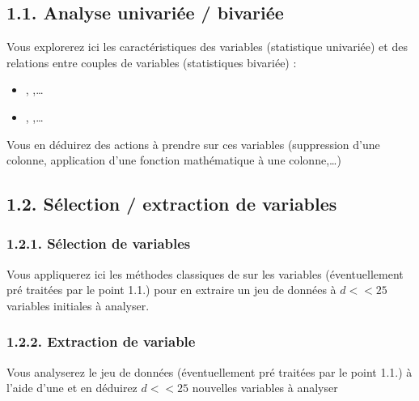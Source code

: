 \documentclass[letterpaper,10pt,french]{sphinxmanual}
\begin{document}
\subsection{1.1. Analyse univariée / bivariée}
\label{\detokenize{TP/TP_etudiant:analyse-univariee-bivariee}}
\sphinxAtStartPar
Vous explorerez ici les caractéristiques des variables (statistique univariée) et des relations entre couples de variables (statistiques bivariée) :
\begin{itemize}
\item {} 
\sphinxAtStartPar
{}, ,…

\item {} 
\sphinxAtStartPar
{}, ,…

\end{itemize}

\sphinxAtStartPar
Vous en déduirez des actions à prendre sur ces variables (suppression d’une colonne, application d’une fonction mathématique à une colonne,…)


\subsection{1.2. Sélection / extraction de variables}
\label{\detokenize{TP/TP_etudiant:selection-extraction-de-variables}}

\subsubsection{1.2.1. Sélection de variables}
\label{\detokenize{TP/TP_etudiant:selection-de-variables}}
\sphinxAtStartPar
Vous appliquerez ici les méthodes classiques de  sur les variables (éventuellement pré traitées par le point 1.1.) pour en extraire un jeu de données à \(d<<25\) variables initiales à analyser.


\subsubsection{1.2.2. Extraction de variable}
\label{\detokenize{TP/TP_etudiant:extraction-de-variable}}
\sphinxAtStartPar
Vous analyserez le jeu de données (éventuellement pré traitées par le point 1.1.) à l’aide d’une  et en déduirez \(d<<25\) nouvelles variables à analyser
\end{document}
